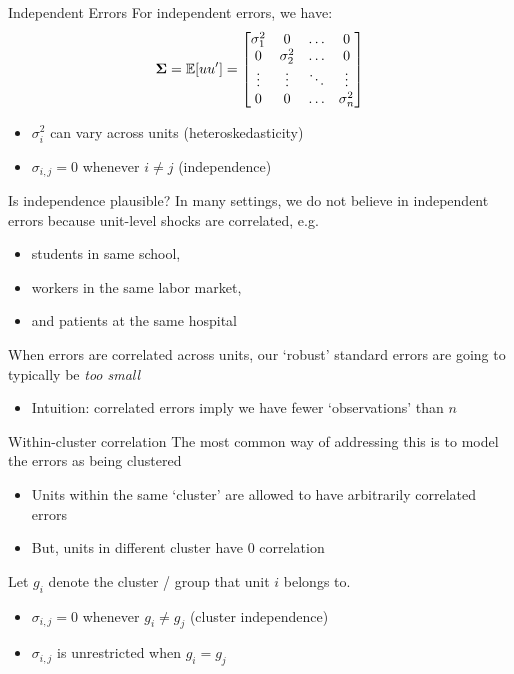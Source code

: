 \documentclass[aspectratio=169,t,11pt,table]{beamer}
\begin{document}
\begin{frame}{Independent Errors}
  For independent errors, we have: 
  $$
    \bm{\Sigma} = \expec{u u'} = 
    \begin{bmatrix}
      \sigma_1^2 & 0 & \dots & 0 \\
      0 & \sigma_2^2 & \dots & 0 \\
      \vdots & \vdots & \ddots & \vdots \\
      0 & 0 & \dots & \sigma_n^2 \\
    \end{bmatrix}
  $$

  \begin{itemize}
    \item $\sigma_i^2$ can vary across units (\alert{heteroskedasticity})
    \item $\sigma_{i,j} = 0$ whenever $i \neq j$ (\alert{independence})
  \end{itemize}
\end{frame}

\begin{frame}{Is independence plausible?}
  In many settings, we do not believe in independent errors because unit-level shocks are \alert{correlated}, e.g.
  \begin{itemize}
    \item students in same school,
    
    \item workers in the same labor market,
    
    \item and patients at the same hospital
  \end{itemize}
  
  \pause
  \bigskip
  When errors are correlated across units, our `robust' standard errors are going to typically be \emph{too small}
  \begin{itemize}
    \item Intuition: correlated errors imply we have fewer `observations' than $n$
  \end{itemize}
\end{frame}

\begin{frame}{Within-cluster correlation}
  The most common way of addressing this is to model the errors as being \alert{clustered}
  \begin{itemize}
    \item Units within the same `cluster' are allowed to have arbitrarily correlated errors
    
    \item But, units in different cluster have 0 correlation
  \end{itemize}

  \pause
  \bigskip
  Let $g_i$ denote the cluster / group that unit $i$ belongs to. 
  \begin{itemize}
    \item $\sigma_{i,j} = 0$ whenever $g_i \neq g_j$ (\alert{cluster independence})
    \item $\sigma_{i,j}$ is unrestricted when $g_i = g_j$
  \end{itemize}
\end{frame}
\end{document}
